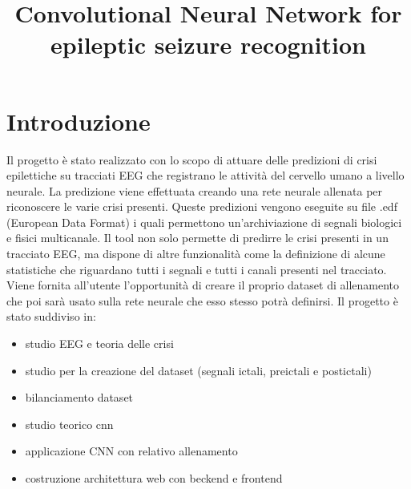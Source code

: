 \documentclass{article}
\begin{document}
\title{Convolutional Neural Network for epileptic seizure recognition}
\maketitle

\tableofcontents

\section*{Introduzione}
Il progetto è stato realizzato con lo scopo di attuare delle predizioni di crisi epilettiche su tracciati EEG che registrano le attività del  cervello umano a livello neurale.
La predizione viene effettuata creando una rete neurale allenata per riconoscere le varie crisi presenti.
Queste predizioni vengono eseguite su file .edf (European Data Format) i quali permettono un'archiviazione di segnali biologici e fisici multicanale.
Il tool non solo permette di predirre le crisi presenti in un tracciato EEG, ma dispone di altre funzionalità come la definizione di alcune statistiche che riguardano tutti i segnali e tutti i canali presenti nel tracciato.
Viene fornita all'utente l'opportunità di creare il proprio dataset di allenamento che poi sarà usato sulla rete neurale che esso stesso potrà definirsi. 
Il progetto è stato suddiviso in:
\begin{itemize}
\item studio EEG e teoria delle crisi
\item studio per la creazione del dataset (segnali ictali, preictali e postictali)
\item bilanciamento dataset
\item studio teorico cnn
\item applicazione CNN con relativo allenamento
\item costruzione architettura web con beckend e frontend 
\end{itemize}
\end{document}
